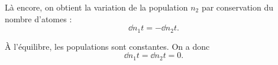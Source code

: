 \documentclass[12pt,fancy]{cours}
\begin{document}
\begin{remarque}
  Là encore, on obtient la variation de la population $n_2$ par conservation du nombre d’atomes :
  \begin{equation}
    \dd{n_1}{t}=-\dd{n_2}{t}.
  \end{equation}
\end{remarque}


 À l’équilibre,  les populations sont constantes. On a donc 
    $$\dd{n_1}{t} = \dd{n_2}{t} = 0.$$ 
\end{document}
